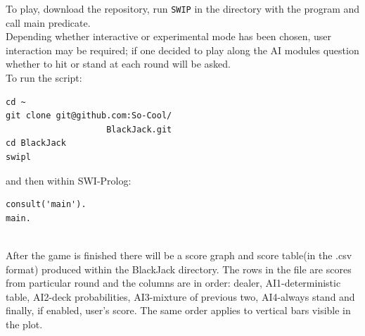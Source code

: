 \documentclass[12pt,a4paper,twocolumn]{article}
\begin{document}
To play, download the repository, run \texttt{SWIP} in the directory with the program and call main predicate.\\
Depending whether interactive or experimental mode has been chosen, user interaction may be required; if one decided to play along the AI modules question whether to hit or stand at each round will be asked.\\

To run the script:

\lstset{language=bash}
\begin{lstlisting}[frame=single]
cd ~
git clone git@github.com:So-Cool/
                    BlackJack.git
cd BlackJack
swipl
\end{lstlisting}

and then within SWI-Prolog:

\lstset{language=Prolog}
\begin{lstlisting}[frame=single]
consult('main').
main.
\end{lstlisting}~\\


After the game is finished there will be a score graph and score table(in the .csv format) produced within the BlackJack directory. The rows in the file are scores from particular round and the columns are in order: dealer, AI1-deterministic table, AI2-deck probabilities, AI3-mixture of previous two, AI4-always stand and finally, if enabled, user's score. The same order applies to vertical bars visible in the plot.




\end{document}
